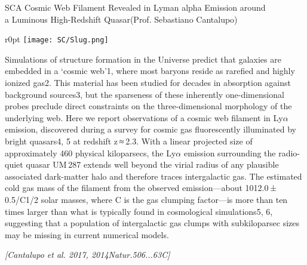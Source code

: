 \begin{section}{SC}{A Cosmic Web Filament Revealed in Lyman alpha Emission around \\
    \hspace*{4cm} a Luminous High-Redshift Quasar}{(Prof. Sebastiano Cantalupo)}
  \begin{minipage}{\linewidth}
    \begin{wrapfigure}{r}{0pt}
      \texttt{[image: SC/Slug.png]}
    \end{wrapfigure}
    \strut {\small Simulations of structure formation in the Universe
      predict that galaxies are embedded in a ‘cosmic web’1, where most
      baryons reside as rarefied and highly ionized gas2. This material has
      been studied for decades in absorption against background sources3,
      but the sparseness of these inherently one-dimensional probes preclude
      direct constraints on the three-dimensional morphology of the
      underlying web. Here we report observations of a cosmic web filament
      in Ly$\alpha$ emission, discovered during a survey for cosmic gas
      fluorescently illuminated by bright quasars4, 5 at redshift z ≈ 2.3.
      With a linear projected size of approximately 460 physical
      kiloparsecs, the Ly$\alpha$ emission surrounding the radio-quiet quasar
      UM 287 extends well beyond the virial radius of any plausible
      associated dark-matter halo and therefore traces intergalactic gas.
      The estimated cold gas mass of the filament from the observed
      emission—about 1012.0 ± 0.5/C1/2 solar masses, where C is the gas
      clumping factor—is more than ten times larger than what is typically
      found in cosmological simulations5, 6, suggesting that a population of
      intergalactic gas clumps with subkiloparsec sizes may be missing in
      current numerical models.}
  \end{minipage}

  \vspace{0.7cm}

  {\footnotesize \textit{[Cantalupo et al. 2017, 2014Natur.506...63C]}}
\end{section}